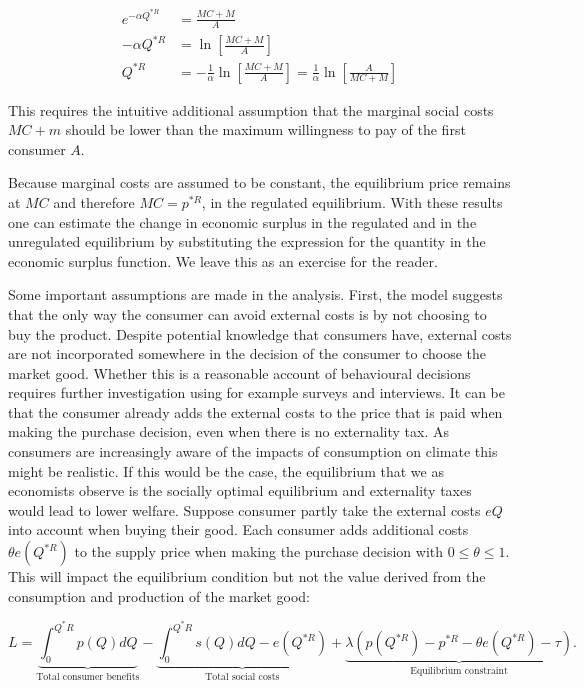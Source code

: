 \documentclass[
]{book}
\begin{document}
\begin{align}
e^{-\alpha Q^{* R}} &= \frac{MC + M}{A} \\
- \alpha Q^{* R} &=\ln \left[\frac{MC + M}{A} \right] \\
Q^{* R} &= -\frac{1}{\alpha}\ln \left[\frac{MC + M}{A} \right]= \frac{1}{\alpha}\ln \left[\frac{A}{MC + M}\right]
\end{align}

This requires the intuitive additional assumption that the marginal social costs \(MC+m\) should be lower than the maximum willingness to pay of the first consumer \(A\).

Because marginal costs are assumed to be constant, the equilibrium price remains at \(MC\) and therefore \(MC=p^{* R}\), in the regulated equilibrium. With these results one can estimate the change in economic surplus in the regulated and in the unregulated equilibrium by substituting the expression for the quantity in the economic surplus function. We leave this as an exercise for the reader.

Some important assumptions are made in the analysis. First, the model suggests that the only way the consumer can avoid external costs is by not choosing to buy the product. Despite potential knowledge that consumers have, external costs are not incorporated somewhere in the decision of the consumer to choose the market good. Whether this is a reasonable account of behavioural decisions requires further investigation using for example surveys and interviews. It can be that the consumer already adds the external costs to the price that is paid when making the purchase decision, even when there is no externality tax. As consumers are increasingly aware of the impacts of consumption on climate this might be realistic. If this would be the case, the equilibrium that we as economists observe is the socially optimal equilibrium and externality taxes would lead to lower welfare. Suppose consumer partly take the external costs \(eQ\) into account when buying their good. Each consumer adds additional costs \(\theta e(Q^{* R})\) to the supply price when making the purchase decision with \(0 \leq \theta \leq 1\). This will impact the equilibrium condition but not the value derived from the consumption and production of the market good:

\begin{equation}
L = \underbrace{\int_0^{Q^\ast R} p(Q)dQ}_\text{Total consumer benefits} - \underbrace{\int^{Q^\ast R}_0 s(Q)dQ - e(Q^{\ast R})}_\text{Total social costs} + \underbrace{\lambda(p(Q^{\ast R}) - p^{\ast R} - \theta e(Q^{* R}) - \tau)}_\text{Equilibrium constraint}.
\end{equation}
\end{document}
